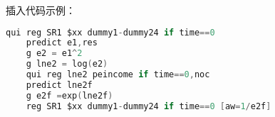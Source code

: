 插入代码示例：
\begin{lstlisting}[language=C]
    qui reg SR1 $xx dummy1-dummy24 if time==0
    predict e1,res
    g e2 = e1^2
    g lne2 = log(e2)
    qui reg lne2 peincome if time==0,noc
    predict lne2f
    g e2f =exp(lne2f)
    reg SR1 $xx dummy1-dummy24 if time==0 [aw=1/e2f]
\end{lstlisting}

